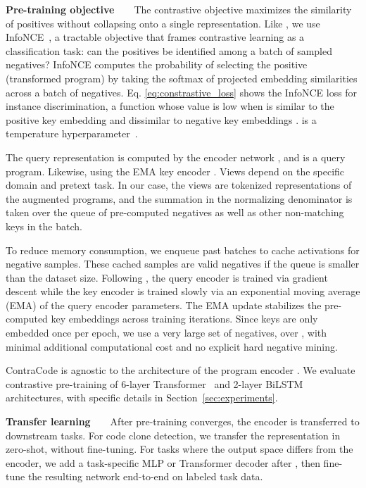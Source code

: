 \documentclass{article}
\newcommand{\ours}[0]{ContraCode}
\begin{document}
\textbf{Pre-training objective}~~~~The contrastive objective maximizes the similarity of positives without collapsing onto a single representation. Like \citet{he2019momentum}, we use InfoNCE~\citep{cpcv1_oord2018representation}, a tractable objective that frames contrastive learning as a classification task: can the positives be identified among a batch of sampled negatives? InfoNCE computes the probability of selecting the positive (transformed program) by taking the softmax of projected embedding similarities across a batch of negatives.
Eq. \eqref{eq:constrastive_loss} shows the InfoNCE loss for instance discrimination, a function whose value is low when  is similar to the positive key embedding  and dissimilar to negative key embeddings .  is a temperature hyperparameter~\cite{wu2018unsupervised}.

The query representation  is computed by the encoder network , and  is a query program. Likewise,  using the EMA key encoder . Views  depend on the specific domain and pretext task. In our case, the views are tokenized representations of the augmented programs, and the summation  in the normalizing denominator is taken over the queue of pre-computed negatives as well as other non-matching keys in the batch.

To reduce memory consumption, we enqueue past batches to cache activations for negative samples. These cached samples are valid negatives if the queue is smaller than the dataset size. Following \citet{he2019momentum}, the query encoder  is trained via gradient descent while the key encoder  is trained slowly via an exponential moving average (EMA) of the query encoder parameters. The EMA update stabilizes the pre-computed key embeddings across training iterations. Since keys are only embedded once per epoch, we use a very large set of negatives, over , with minimal additional computational cost and no explicit hard negative mining.

\ours{} is agnostic to the architecture of the program encoder . We evaluate contrastive pre-training of 6-layer Transformer~\citep{vaswani2017attention} and 2-layer BiLSTM~\citep{schuster1997bidirectional, huang2015bidirectional} architectures, with specific details in Section~\ref{sec:experiments}.

\textbf{Transfer learning}~~~~After pre-training converges, the encoder  is transferred to downstream tasks. For code clone detection, we transfer the representation  in zero-shot, without fine-tuning. For tasks where the output space differs from the encoder, we add a task-specific MLP or Transformer decoder after , then fine-tune the resulting network end-to-end on labeled task data.
\end{document}
